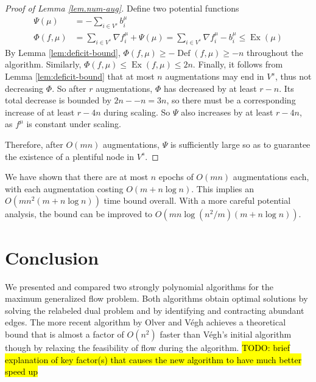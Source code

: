 \documentclass[11pt]{article}
\theoremstyle{definition}
\theoremstyle{definition}
\theoremstyle{definition}
\newcommand{\fu}{f^{\mu}}
\newcommand{\nfiu}{\nabla \fu_i}
\newcommand{\biu}{b_{i}^{\mu}}
\newcommand{\vsrc}{V^{s}}
\DeclareMathOperator{\Ex}{Ex}
\DeclareMathOperator{\Def}{Def}
\renewcommand{\todo}[1]{\hl{TODO: #1}}
\begin{document}
    \begin{proof}[Proof of Lemma \ref{lem.num-aug}]
    Define two potential functions
    \begin{align*}
    \Psi(\mu) &= - \sum_{i \in \vsrc} \biu \\
    \Phi(f, \mu) &= \sum_{i \in \vsrc} \nfiu + \Psi(\mu) = \sum_{i \in \vsrc} \nfiu - \biu
                 \leq \Ex(\mu)
    \end{align*}
    By Lemma \ref{lem:deficit-bound}, $\Phi(f, \mu) \geq -\Def(f, \mu) \geq -n$
    throughout the algorithm. Similarly, $\Phi(f, \mu) \leq \Ex(f, \mu) \leq 2n$.
    Finally, it follows from Lemma \ref{lem:deficit-bound} that at most $n$ augmentations
    may end in $\vsrc$, thus not decreasing $\Phi$. So after $r$ augmentations,
    $\Phi$ has decreased by at least $r - n$. Its total decrease is bounded by $2n - -n = 3n$,
    so there must be a corresponding increase of at least $r - 4n$ during scaling. So
    $\Psi$ also increases by at least $r - 4n$, as $f^\mu$ is constant under scaling.
    
    Therefore, after $O(mn)$ augmentations, $\Psi$ is sufficiently large so as to guarantee
    the existence of a plentiful node in $V^s$.
    \end{proof}
    We have shown that there are at most $n$ epochs of $O(mn)$ augmentations each, with
    each augmentation costing $O(m + n\log n)$. This implies an $O(mn^2(m + n\log n))$
    time bound overall. With a more careful potential analysis, the bound can be improved
    to $O(mn\log(n^2/m)(m + n \log n))$.


\section{Conclusion}\label{sec:discussion} 

We presented and compared two strongly polynomial algorithms for the maximum generalized flow problem. Both algorithms obtain optimal solutions by solving the relabeled dual problem and by identifying and contracting abundant edges. The more recent algorithm by Olver and Végh achieves a theoretical bound that is almost a factor of $O(n^2)$ faster than Végh's initial algorithm though by relaxing the feasibility of flow during the algorithm. \todo{brief explanation of key factor(s) that causes the new algorithm to have much better speed up}



    

\setlength{\bibitemsep}{0pt}
\nocite{*}
\printbibliography
\end{document}
